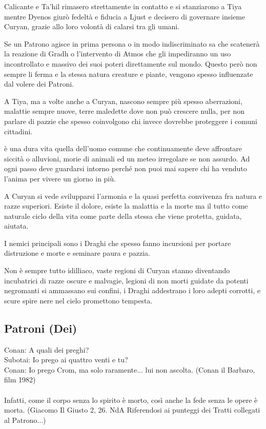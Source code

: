 \documentclass[a4paper,11pt,twoside,openany]{book}
\begin{document}
Calicante e Ta'hil rimasero strettamente in contatto e si stanziarono a Tiya mentre Dyenos giurò fedeltà e fiducia a Ljust e decisero di governare insieme Curyan, grazie allo loro volontà di calarsi tra gli umani.

Se un Patrono agisce in prima persona o in modo indiscriminato sa che scatenerà la reazione di Gradh o l'intervento di Atmos che gli impediranno un uso incontrollato e massivo dei suoi poteri direttamente sul mondo. Questo però non sempre li ferma e la stessa natura creature e piante, vengono spesso influenzate dal volere dei Patroni.

A Tiya, ma a volte anche a Curyan, nascono sempre più spesso aberrazioni, malattie sempre nuove, terre maledette dove non può crescere nulla, per non parlare di pazzie che spesso coinvolgono chi invece dovrebbe proteggere i comuni cittadini.

è una dura vita quella dell'uomo comune che continuamente deve affrontare siccità o alluvioni, morie di animali ed un meteo irregolare se non assurdo. Ad ogni passo deve guardarsi intorno perché non puoi mai sapere chi ha venduto l'anima per vivere un giorno in più.

A Curyan si vede svilupparsi l'armonia e la quasi perfetta convivenza fra natura e razze superiori. Esiste il dolore, esiste la malattia e la morte ma il tutto come naturale ciclo della vita come parte della stessa che viene protetta, guidata, aiutata.

I nemici principali sono i Draghi che spesso fanno incursioni per portare distruzione e morte e seminare paura e pazzia.

Non è sempre tutto idilliaco, vaste regioni di Curyan stanno diventando incubatrici di razze oscure e malvagie, legioni di non morti guidate da potenti negromanti si ammassano sui confini, i Draghi addestrano i loro adepti corrotti, e scure spire nere nel cielo promettono tempesta.

\pagebreak

\subsection{Patroni (Dei)}

\label{patroni-dei}
\begin{tcolorbox}[enhanced,arc=5pt,boxrule=0.3pt]{
Conan: A quali dei preghi?\\
Subotai: Io prego ai quattro venti e tu?\\
Conan: Io prego Crom, ma solo raramente... lui non ascolta. (Conan il Barbaro, film 1982)\\\\
Infatti, come il corpo senza lo spirito è morto, così anche la fede senza le opere è morta. (Giacomo Il Giusto 2, 26. NdA Riferendosi ai punteggi dei Tratti collegati al Patrono...)}\end{tcolorbox}\medskip
\end{document}
